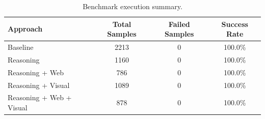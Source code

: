 \begin{table}[t]
  \caption{Benchmark execution summary.}
  \label{tab:summary}
  \centering
  \begin{tabular}{lccc}
    \hline
    \textbf{Approach} & \textbf{Total Samples} & \textbf{Failed Samples} & \textbf{Success Rate} \\
    \hline
    Baseline                  & 2213 & 0 & 100.0\% \\
    Reasoning                 & 1160 & 0 & 100.0\% \\
    Reasoning + Web           & 786 & 0 & 100.0\% \\
    Reasoning + Visual        & 1089 & 0 & 100.0\% \\
    Reasoning + Web + Visual  & 878 & 0 & 100.0\% \\
    \hline
  \end{tabular}
\end{table}